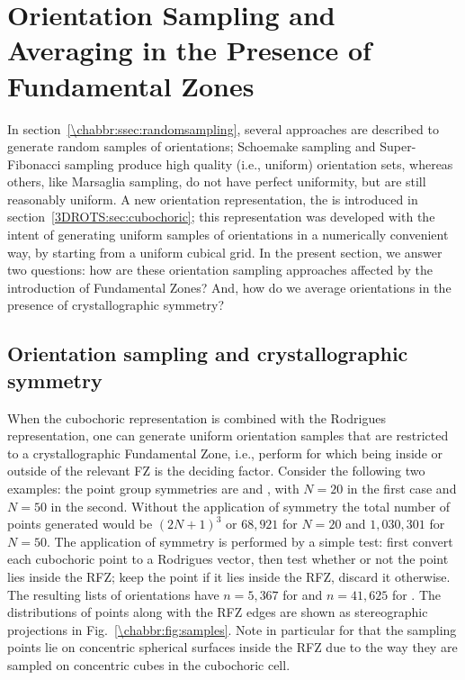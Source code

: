 \section{Orientation Sampling and Averaging in the Presence of Fundamental Zones}\label{\chabbr:sec:samplingRFZs}
In section~\ref{\chabbr:ssec:randomsampling}, several approaches are described to generate random samples of orientations; Schoemake sampling and Super-Fibonacci sampling produce high quality (i.e., uniform) orientation sets, whereas others, like Marsaglia sampling, do not have perfect uniformity, but are still reasonably uniform.  A new orientation representation, the  is introduced in section~\ref{3DROTS:sec:cubochoric}; this representation was developed with the intent of generating uniform samples of orientations in a numerically convenient way, by starting from a uniform cubical grid.  In the present section, we answer two questions: how are these orientation sampling approaches affected by the introduction of Fundamental Zones? And, how do we average orientations in the presence of crystallographic symmetry?

\subsection{Orientation sampling and crystallographic symmetry}\label{\chabbr:ssec:RFZsampling}
When the cubochoric representation is combined with the Rodrigues representation, one can generate uniform orientation samples that are restricted to a crystallographic Fundamental Zone, i.e., perform  for which being inside or outside of the relevant FZ is the deciding factor.  Consider the following two examples: the point group symmetries are  and , with $N=20$ in the first case and $N=50$ in the second. Without the application of symmetry the total number of points generated would be $(2N+1)^3$ or $68,921$ for $N=20$ and $1,030,301$ for $N=50$.  The application of symmetry is performed by a simple test: first convert each cubochoric point to a Rodrigues vector, then test whether or not the point lies inside the RFZ; keep the point if it lies inside the RFZ, discard it otherwise. The resulting lists of orientations have $n=5,367$ for  and $n=41,625$ for .  The distributions of points along with the RFZ edges are shown as stereographic projections in Fig.~\ref{\chabbr:fig:samples}. Note in particular for  that the sampling points lie on concentric spherical surfaces inside the RFZ due to the way they are sampled on concentric cubes in the cubochoric cell.

